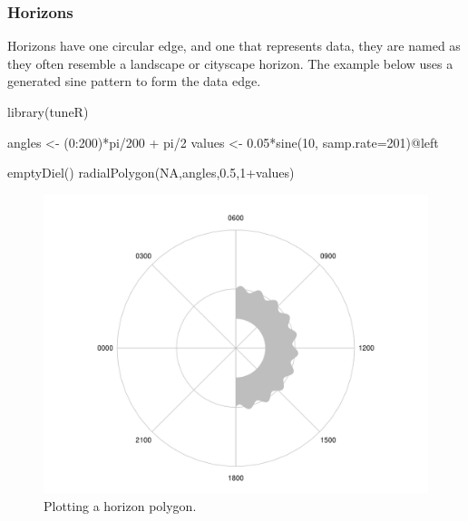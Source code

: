 \documentclass[
]{book}
\newenvironment{Shaded}{\begin{snugshade}}{\end{snugshade}}
\newcommand{\AttributeTok}[1]{\textcolor[rgb]{0.77,0.63,0.00}{#1}}
\newcommand{\ConstantTok}[1]{\textcolor[rgb]{0.00,0.00,0.00}{#1}}
\newcommand{\DecValTok}[1]{\textcolor[rgb]{0.00,0.00,0.81}{#1}}
\newcommand{\FloatTok}[1]{\textcolor[rgb]{0.00,0.00,0.81}{#1}}
\newcommand{\FunctionTok}[1]{\textcolor[rgb]{0.00,0.00,0.00}{#1}}
\newcommand{\NormalTok}[1]{#1}
\newcommand{\OtherTok}[1]{\textcolor[rgb]{0.56,0.35,0.01}{#1}}
\newcommand{\SpecialCharTok}[1]{\textcolor[rgb]{0.00,0.00,0.00}{#1}}
\begin{document}
\hypertarget{horizons}{%
\subsubsection{Horizons}\label{horizons}}

Horizons have one circular edge, and one that represents data, they are named as they often resemble a landscape or cityscape horizon. The example below uses a generated sine pattern to form the data edge.

\begin{Shaded}
\begin{Highlighting}[]
\FunctionTok{library}\NormalTok{(tuneR)}

\NormalTok{angles }\OtherTok{\textless{}{-}}\NormalTok{ (}\DecValTok{0}\SpecialCharTok{:}\DecValTok{200}\NormalTok{)}\SpecialCharTok{*}\NormalTok{pi}\SpecialCharTok{/}\DecValTok{200} \SpecialCharTok{+}\NormalTok{ pi}\SpecialCharTok{/}\DecValTok{2}
\NormalTok{values }\OtherTok{\textless{}{-}} \FloatTok{0.05}\SpecialCharTok{*}\FunctionTok{sine}\NormalTok{(}\DecValTok{10}\NormalTok{, }\AttributeTok{samp.rate=}\DecValTok{201}\NormalTok{)}\SpecialCharTok{@}\NormalTok{left}

\FunctionTok{emptyDiel}\NormalTok{()}
\FunctionTok{radialPolygon}\NormalTok{(}\ConstantTok{NA}\NormalTok{,angles,}\FloatTok{0.5}\NormalTok{,}\DecValTok{1}\SpecialCharTok{+}\NormalTok{values)}
\end{Highlighting}
\end{Shaded}

\begin{figure}

{\centering \includegraphics[width=0.9\linewidth]{_main_files/figure-latex/radialPolygon-horizon-1} 

}

\caption{Plotting a horizon polygon.}\label{fig:radialPolygon-horizon}
\end{figure}
\end{document}
